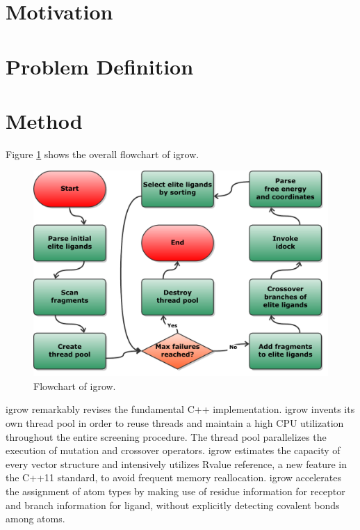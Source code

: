 \documentclass[10pt, conference, compsocconf]{../IEEEtran}
\begin{document}
\section{Motivation}



\section{Problem Definition}



\section{Method}

Figure \ref{fig:Flowchart} shows the overall flowchart of igrow. 

\begin{figure}
\centering
\includegraphics[width=\linewidth]{Figures/Flowchart.pdf}
\caption{Flowchart of igrow.}
\label{fig:Flowchart}
\end{figure}

igrow remarkably revises the fundamental C++ implementation. igrow invents its own thread pool in order to reuse threads and maintain a high CPU utilization throughout the entire screening procedure. The thread pool parallelizes the execution of mutation and crossover operators. igrow estimates the capacity of every vector structure and intensively utilizes Rvalue reference, a new feature in the C++11 standard, to avoid frequent memory reallocation. igrow accelerates the assignment of atom types by making use of residue information for receptor and branch information for ligand, without explicitly detecting covalent bonds among atoms.
\end{document}
